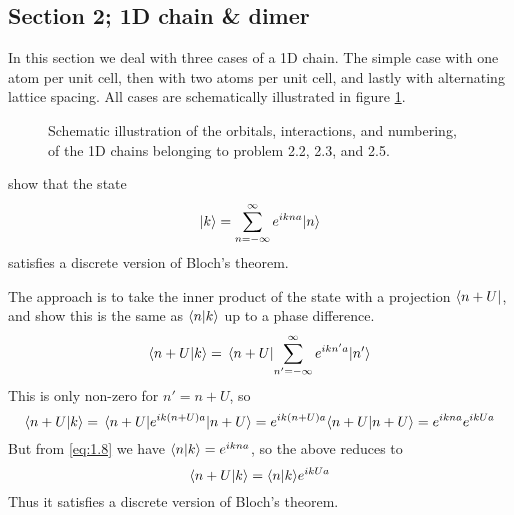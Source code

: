 \subsection{Section 2; 1D chain \& dimer}
In this section we deal with three cases of a 1D chain. The simple case with one atom per unit cell, then with two atoms per unit cell, and lastly with alternating lattice spacing. All cases are schematically illustrated in figure \ref{fig:1D_Chain}.
\begin{figure}[!ht]
    \centering
    
    \caption{Schematic illustration of the orbitals, interactions, and numbering, of the 1D chains belonging to problem 2.2, 2.3, and 2.5.}
    \label{fig:1D_Chain}
\end{figure}

\begin{exercise}
show that the state 
\begin{equation}
    |k\rangle = \sum_{n = - \infty}^{\infty} e^{ikna} |n\rangle
    \label{eq:1.8}
\end{equation}
satisfies a discrete version of Bloch's theorem.
\end{exercise}

\begin{solution}
The approach is to take the inner product of the state with a projection $\langle n+U |$, and show this is the same as $\langle n | k \rangle$ up to a phase difference.
\begin{equation}
    \langle n+U | k \rangle = \mel{n+U}{\sum_{n'=-\infty}^{\infty}e^{ikn'a}}{n'}
\end{equation}
This is only non-zero for $n'=n+U$, so
\begin{equation}
    \langle n+U | k \rangle = \mel{n+U}{e^{ik(n+U)a}}{n+U} = e^{ik(n+U)a}\langle n+U | n+U \rangle = e^{ikna}e^{ikUa}
\end{equation}
But from \eqref{eq:1.8} we have $\langle n | k \rangle = e^{ikna}$, so the above reduces to
\begin{equation}
    \langle n+U | k \rangle = \langle n | k \rangle e^{ikUa}
\end{equation}
Thus it satisfies a discrete version of Bloch's theorem.


\end{solution}

